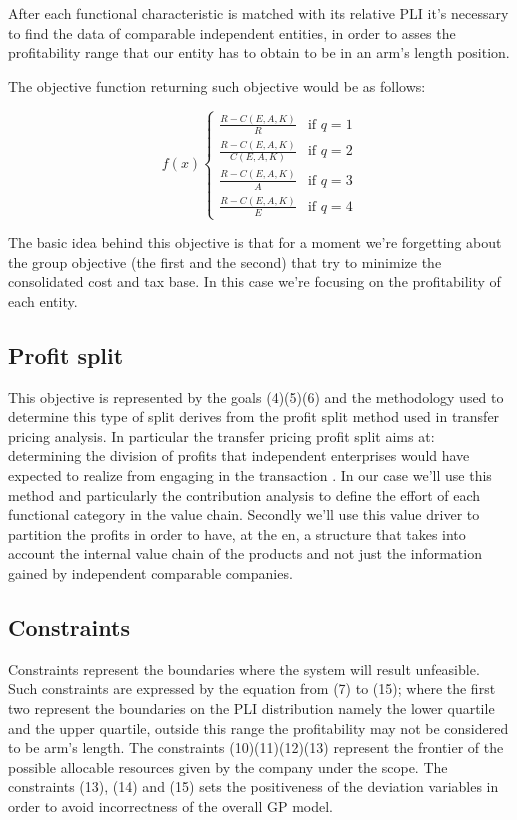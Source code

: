 \documentclass{article}
\begin{document}
After each functional characteristic is matched with its relative PLI it's necessary to find the data of comparable independent entities, in order to asses the profitability range that our entity has to obtain to be in an arm's length position.

The objective function returning such objective would be as follows:

\begin{equation}
f(x) 
\begin{cases}
   \frac{R - C(E,A,K)}{R} & \text{if } q=1
   \\
   \frac{R - C(E,A,K)}{C(E,A,K)} & \text{if } q=2
   \\
   \frac{R - C(E,A,K)}{A} & \text{if } q=3
   \\
   \frac{R - C(E,A,K)}{E} & \text{if } q=4
\end{cases}
\end{equation}

The basic idea behind this objective is that for a moment we're forgetting about the group objective (the first and the second) that try to minimize the consolidated cost and tax base. In this case we're focusing on the profitability of each entity.

\subsection{Profit split}
This objective is represented by the goals (4)(5)(6) and the methodology used to determine this type of split derives from the profit split method used in transfer pricing analysis. In particular the transfer pricing profit split aims at: determining the division of profits that independent enterprises would have expected to realize from engaging in the transaction \cite{OECD_ProfitSplit_2017}. In our case we'll use this method and particularly the contribution analysis to define the effort of each functional category in the value chain. Secondly we'll use this value driver to partition the profits in order to have, at the en, a structure that takes into account the internal value chain of the products and not just the information gained by independent comparable companies.


\subsection{Constraints}
Constraints represent the boundaries where the system will result unfeasible. Such constraints are expressed by the equation from (7) to (15); where the first two represent the boundaries on the PLI distribution namely the lower quartile and the upper quartile, outside this range the profitability may not be considered to be arm's length. The constraints (10)(11)(12)(13) represent the frontier of the possible allocable resources given by the company under the scope. The constraints (13), (14) and (15) sets the positiveness of the deviation variables in order to avoid incorrectness of the overall GP model.
\end{document}
